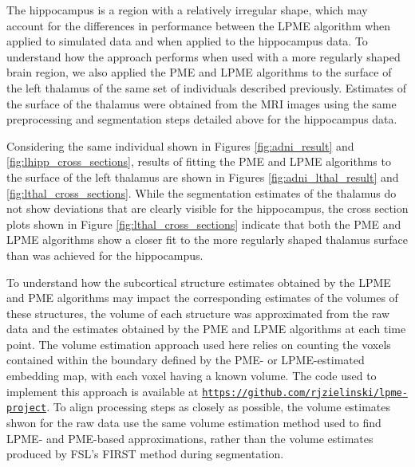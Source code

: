 \documentclass[11pt,reqno]{article}
\theoremstyle{definition}
\begin{document}
The hippocampus is a region with a relatively irregular shape, which may account for the differences in performance between the LPME algorithm when applied to simulated data and when applied to the hippocampus data. To understand how the approach performs when used with a more regularly shaped brain region, we also applied the PME and LPME algorithms to the surface of the left thalamus of the same set of individuals described previously. Estimates of the surface of the thalamus were obtained from the MRI images using the same preprocessing and segmentation steps detailed above for the hippocampus data.

Considering the same individual shown in Figures \ref{fig:adni_result} and \ref{fig:lhipp_cross_sections}, results of fitting the PME and LPME algorithms to the surface of the left thalamus are shown in Figures \ref{fig:adni_lthal_result} and \ref{fig:lthal_cross_sections}. While the segmentation estimates of the thalamus do not show deviations that are clearly visible for the hippocampus, the cross section plots shown in Figure \ref{fig:lthal_cross_sections} indicate that both the PME and LPME algorithms show a closer fit to the more regularly shaped thalamus surface than was achieved for the hippocampus.

To understand how the subcortical structure estimates obtained by the LPME and PME algorithms may impact the corresponding estimates of the volumes of these structures, the volume of each structure was approximated from the raw data and the estimates obtained by the PME and LPME algorithms at each time point. The volume estimation approach used here relies on counting the voxels contained within the boundary defined by the PME- or LPME-estimated embedding map, with each voxel having a known volume.  The code used to implement this approach is available at \href{https://github.com/rjzielinski/lpme-project}{\texttt{https://github.com/rjzielinski/lpme-project}}. To align processing steps as closely as possible, the volume estimates shwon for the raw data use the same volume estimation method used to find LPME- and PME-based approximations, rather than the volume estimates produced by FSL's FIRST method during segmentation.
\end{document}
